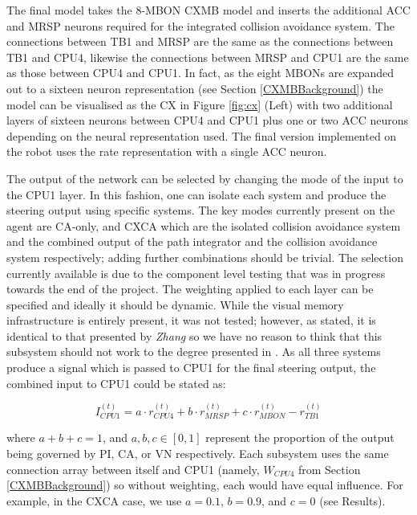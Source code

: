 \documentclass[a4paper,11pt,twoside,openright]{article}
\begin{document}
The final model takes the 8-MBON CXMB model and inserts the additional
ACC and MRSP neurons required for the integrated collision avoidance
system. The connections between TB1 and MRSP are the same as the
connections between TB1 and CPU4, likewise the connections between
MRSP and CPU1 are the same as those between CPU4 and CPU1. In fact, as
the eight MBONs are expanded out to a sixteen neuron representation
(see Section \ref{CXMBBackground}) the model can be visualised as the
CX in Figure \ref{fig:cx} (Left) with two additional layers of sixteen
neurons between CPU4 and CPU1 plus one or two ACC neurons depending on
the neural representation used. The final version implemented on the
robot uses the rate representation with a single ACC neuron.
\newline\par

The output of the network can be selected by changing the mode of the
input to the CPU1 layer. In this fashion, one can isolate each system
and produce the steering output using specific systems. The key modes
currently present on the agent are CA-only, and CXCA which are the
isolated collision avoidance system and the combined output of the
path integrator and the collision avoidance system respectively;
adding further combinations should be trivial. The selection currently
available is due to the component level testing that was in progress
towards the end of the project. The weighting applied to each layer
can be specified and ideally it should be dynamic. While the visual
memory infrastructure is entirely present, it was not tested; however,
as stated, it is identical to that presented by \textit{Zhang} so we
have no reason to think that this subsystem should not work to the
degree presented in \cite{Zhang2017}. As all three systems produce a
signal which is passed to CPU1 for the final steering output, the
combined input to CPU1 could be stated as:

\begin{equation}
  I_{CPU1}^{(t)} = a \cdot r_{CPU4}^{(t)} + b \cdot r_{MRSP}^{(t)} + c \cdot r_{MBON}^{(t)} - r_{TB1}^{(t)}
\end{equation}

where $a + b + c = 1$, and $a,b,c \in [0,1]$ represent the proportion of the
output being governed by PI, CA, or VN respectively. Each subsystem
uses the same connection array between itself and CPU1 (namely,
$W_{CPU4}$ from Section \ref{CXMBBackground}) so without weighting,
each would have equal influence. For example, in the CXCA case, we
use $a=0.1$, $b=0.9$, and $c=0$ (see Results).
\end{document}
